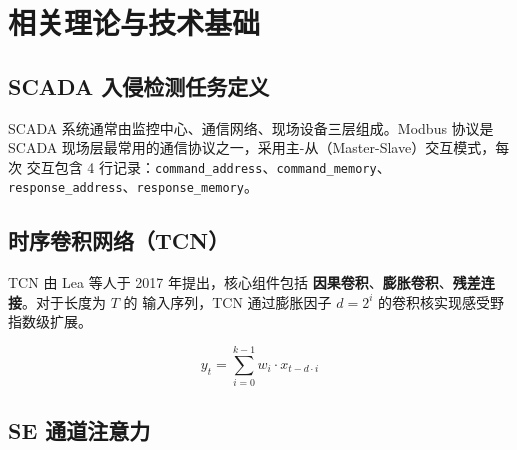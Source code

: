 
\chapter{相关理论与技术基础}
\label{chap:related}


\section{SCADA 入侵检测任务定义}
\label{sec:scada_task}

\par SCADA 系统通常由监控中心、通信网络、现场设备三层组成。Modbus 协议是
SCADA 现场层最常用的通信协议之一，采用主-从（Master-Slave）交互模式，每次
交互包含 4 行记录：\texttt{command\_address}、\texttt{command\_memory}、
\texttt{response\_address}、\texttt{response\_memory}。


\section{时序卷积网络（TCN）}
\label{sec:tcn}

\par TCN \cite{ref:bai2018tcn} 由 Lea 等人于 2017 年提出，核心组件包括
\textbf{因果卷积}、\textbf{膨胀卷积}、\textbf{残差连接}。对于长度为 $T$ 的
输入序列，TCN 通过膨胀因子 $d = 2^i$ 的卷积核实现感受野指数级扩展。

\begin{equation}
  y_t = \sum_{i=0}^{k-1} w_i \cdot x_{t - d \cdot i}
  \label{eq:tcn_conv}
\end{equation}



\section{SE 通道注意力}
\label{sec:se}

